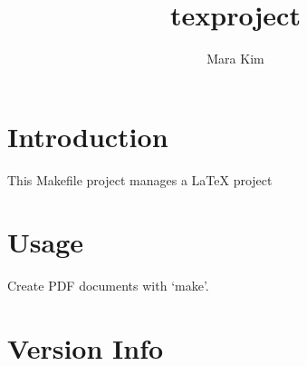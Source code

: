 \documentclass{article}
\author{Mara Kim}
\title{texproject}
\begin{document}
\maketitle
\tableofcontents
\section{Introduction}
This Makefile project manages a \LaTeX{} project
\section{Usage}
Create PDF documents with `make'.
\section*{Version Info}
\scriptsize{ }
\end{document}
